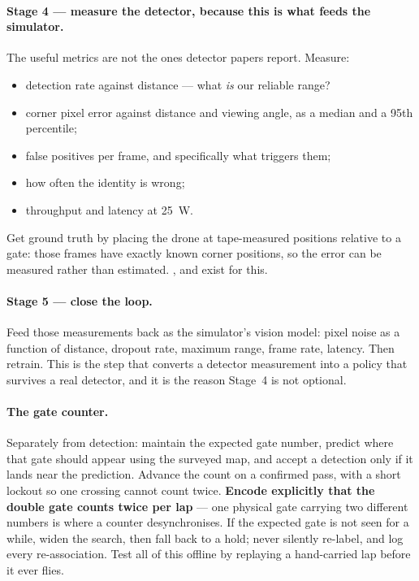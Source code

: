 \paragraph{Stage 4 --- measure the detector, because this is what feeds the simulator.}
The useful metrics are not the ones detector papers report. Measure:
\begin{itemize}
\item detection rate against distance --- what \emph{is} our reliable range?
\item corner pixel error against distance and viewing angle, as a median and a 95th percentile;
\item false positives per frame, and specifically what triggers them;
\item how often the identity is wrong;
\item throughput and latency at \SI{25}{W}.
\end{itemize}
Get ground truth by placing the drone at tape-measured positions relative to a gate: those frames have
exactly known corner positions, so the error can be measured rather than estimated.
,  and 
exist for this.

\paragraph{Stage 5 --- close the loop.}
Feed those measurements back as the simulator's vision model: pixel noise as a function of distance,
dropout rate, maximum range, frame rate, latency. Then retrain. This is the step that converts a
detector measurement into a policy that survives a real detector, and it is the reason Stage~4 is not
optional.

\paragraph{The gate counter.}
Separately from detection: maintain the expected gate number, predict where that gate should appear
using the surveyed map, and accept a detection only if it lands near the prediction. Advance the
count on a confirmed pass, with a short lockout so one crossing cannot count twice. \textbf{Encode
explicitly that the double gate counts twice per lap} --- one physical gate carrying two different
numbers is where a counter desynchronises. If the expected gate is not seen for a while, widen the
search, then fall back to a hold; never silently re-label, and log every re-association. Test all of
this offline by replaying a hand-carried lap before it ever flies.

